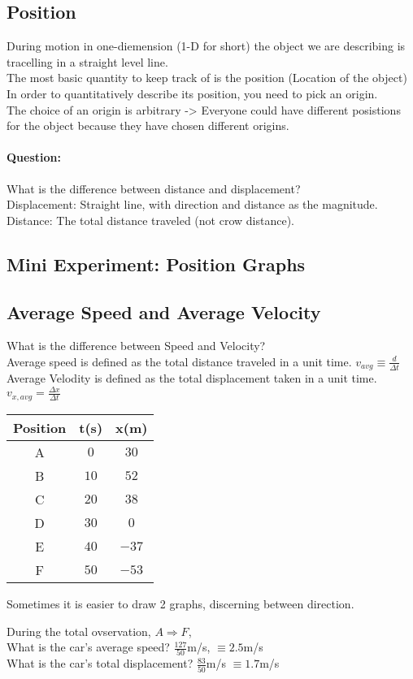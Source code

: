 \documentclass[]{article}
\begin{document}
\subsection*{Position}
During motion in one-diemension (1-D for short) the object we are describing is tracelling in a straight level line.\\
The most basic quantity to keep track of is the position (Location of the object)\\
In order to quantitatively describe its position, you need to pick an origin.\\
The choice of an origin is arbitrary -> Everyone could have different posistions for the object because they have chosen different origins.

\paragraph{Question:} What is the difference between distance and displacement?\\
Displacement: Straight line, with direction and distance as the magnitude.\\
Distance: The total distance traveled (not crow distance).

\subsection{Mini Experiment: Position Graphs}


\subsection*{Average Speed and Average Velocity}
What is the difference between Speed and Velocity?\\
Average speed is defined as the total distance traveled in a unit time. $v_{avg} \equiv \frac{d}{\Delta t}$\\
Average Velodity is defined as the total displacement taken in a unit time. $v_{x,avg} = \frac{\Delta x}{\Delta t}$

\begin{tabular}{|c|c|c|}
	Position&t(s)&x(m)\\
	\hline
	A&$0$&$30$\\
	B&$10$&$52$\\
	C&$20$&$38$\\
	D&$30$&$0$\\
	E&$40$&$-37$\\
	F&$50$&$-53$
\end{tabular}

Sometimes it is easier to draw 2 graphs, discerning between direction.

During the total ovservation, $A\Rightarrow F$,\\
What is the car's average speed? $\frac{127}{50}$m/s, $\equiv 2.5$m/s\\
What is the car's total displacement? $\frac{83}{50}$m/s $\equiv 1.7$m/s\\
\end{document}
